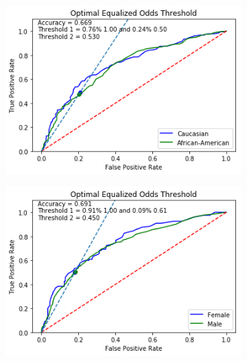\documentclass[11pt, fleqn, titlepage]{article}
\begin{document}
\begin{figure}[H]
		\begin{subfigure}{0.5\textwidth}
			\centering
			\includegraphics[width=0.9\linewidth]{"imgs/Equalized Odds Correctied"}
		\end{subfigure}%
		\begin{subfigure}{0.5\textwidth}
			\centering
			\includegraphics[width=0.9\linewidth]{"imgs/Equalized Odds Correctied_sex"}
		\end{subfigure}

\end{figure}
\end{document}
